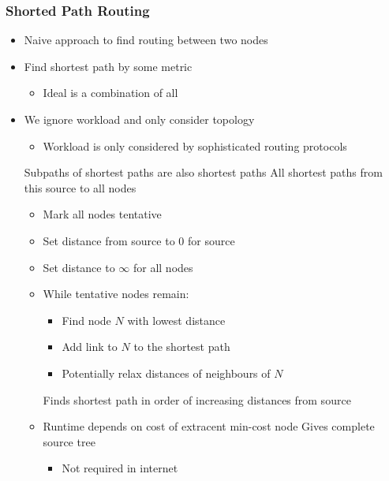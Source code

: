 \subsubsection{Shorted Path Routing}
\begin{itemize}
    \item Naive approach to find routing between two nodes
    \item Find shortest path by some metric
        \begin{itemize}
             Avoid circuitous paths
             Avoid small pipes
             Avoid expensive links
             To reduce switching
            \item Ideal is a combination of all
        \end{itemize}
    \item We ignore workload and only consider topology
        \begin{itemize}
            \item Workload is only considered by sophisticated routing protocols
        \end{itemize}
     Subpaths of shortest paths are also shortest paths
     All shortest paths from this source to all nodes
        \begin{itemize}
            \item Mark all nodes tentative
            \item Set distance from source to $0$ for source
            \item Set distance to $\infty$ for all nodes
            \item While tentative nodes remain:
                \begin{itemize}
                    \item Find node $N$ with lowest distance
                    \item Add link to $N$ to the shortest path
                    \item Potentially relax distances of neighbours of $N$
                \end{itemize}
            \ipro Finds shortest path in order of increasing distances from source
            \item Runtime depends on cost of extracent min-cost node
            \icon Gives complete source tree
                \begin{itemize}
                    \item Not required in internet

\end{itemize}
\end{itemize}
\end{itemize}
